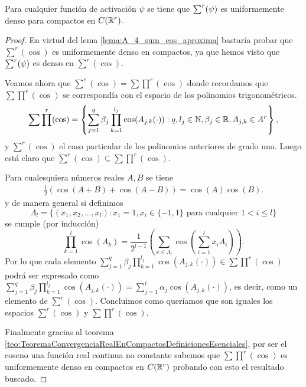 \begin{lema} \label{lema:A_5_uniformemente_denso_compactos}
    Para cualquier función de activación $\psi$ se tiene que 
    $\sum^r (\psi)$ es uniformemente denso para compactos en $C(\mathbb{R}^r).$
\end{lema}
\begin{proof}
    En virtud del lema \ref{lema:A_4_sum_cos_aproxima} 
    bastaría probar que $\sum^r(\cos)$ es uniformemente 
    denso en compactos, ya que hemos visto que $\sum^r (\psi)$ 
    es denso en $\sum^r(\cos)$. 

    Veamos ahora que $\sum^r(\cos) = \sum \prod^r(\cos)$ 
    donde recordamos que $\sum \prod^r(\cos)$ se correspondía
    con el espacio de los polinomios trigonométricos. 
    \begin{equation}
        \sum \prod^r(\cos) = 
        \left\{
            \sum_{j=1}^q \beta_j 
            \prod_{k=1}^{l_j} \cos(A_{j,k}(\cdot)) 
            : q, l_j \in \mathbb{N}, \beta_j \in \mathbb{R}, A_{j,k}\in A^r
        \right\},
    \end{equation}
    y  $\sum^r(\cos)$ el caso particular de los polinomios anteriores 
    de grado uno. Luego está claro que $\sum^r(\cos) \subseteq \sum \prod^r(\cos).$
    
    Para cualesquiera números reales $A,B$
    se tiene 
    \begin{equation}
        \begin{split}
            \frac{1}{2}(\cos(A + B)  + \cos(A - B))
            = \cos(A)\cos(B).
        \end{split} 
    \end{equation}  
    y de manera general si definimos 
    \begin{equation}
        \Lambda_l = \{
            (x_1, x_2, ..., x_l) : 
            x_1 = 1, x_i \in \{-1, 1\} 
            \text{ para cualquier } 1 < i \leq l
        \}
    \end{equation}
    se cumple (por inducción) 
    \begin{equation}
        \prod^l_{k=1} \cos(A_k) = 
        \frac{1}{2^{l-1}}(\sum_{x \in \Lambda_l}
         \cos(\sum_{i=1}^l x_i A_i)). 
    \end{equation}
    Por lo que cada elemento 
    $\sum_{j=1}^q \beta_j \prod_{k=1}^{l_j} \cos(A_{j,k}(\cdot)) \in \sum \prod^r(\cos)$
    podrá ser expresado como 
    $\sum_{j=1}^q \beta_j \prod_{k=1}^{l_j} \cos(A_{j,k}(\cdot)) = 
    \sum_{j=1}^t \alpha_j \cos(A_{j,k}(\cdot))$, es decir, como un elemento 
    de $\sum^r(\cos)$. Concluimos como queríamos que son iguales
    los espacios
    $\sum^r(\cos)$ y $\sum \prod^r(\cos)$. 

    Finalmente gracias al teorema \ref{teo:TeoremaConvergenciaRealEnCompactosDefinicionesEsenciales},
    por ser  el coseno una función real continua no constante sabemos que 
    $\sum \prod^r(\cos)$ es uniformemente denso en compactos en $C(\mathbb{R}^r)$ 
    probando con esto el resultado buscado. 
    
\end{proof}

